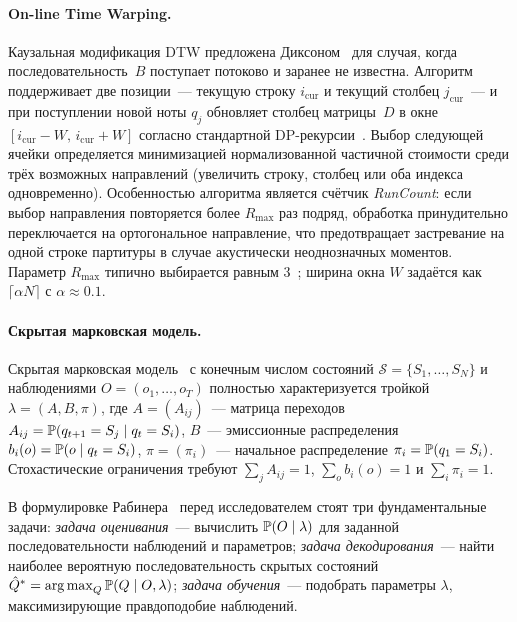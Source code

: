 \paragraph*{On-line Time Warping.} Каузальная модификация DTW
предложена Диксоном~\cite{Dixon2005} для случая, когда
последовательность~$B$ поступает потоково и заранее не известна.
Алгоритм поддерживает две позиции~--- текущую строку
$i_{\text{cur}}$ и текущий столбец $j_{\text{cur}}$~--- и при
поступлении новой ноты $q_j$ обновляет столбец матрицы~$D$ в окне
$[i_{\text{cur}}-W,\,i_{\text{cur}}+W]$ согласно стандартной
DP-рекурсии~. Выбор следующей ячейки
определяется минимизацией нормализованной частичной стоимости
среди трёх возможных направлений (увеличить строку, столбец или
оба индекса одновременно). Особенностью алгоритма является
счётчик \textit{RunCount}: если выбор направления повторяется
более $R_{\max}$ раз подряд, обработка принудительно
переключается на ортогональное направление, что предотвращает
застревание на одной строке партитуры в случае акустически
неоднозначных моментов. Параметр $R_{\max}$ типично выбирается
равным $3$~\cite{Dixon2005}; ширина окна $W$ задаётся как
$\lceil \alpha N\rceil$ с $\alpha\approx 0.1$.

\paragraph*{Скрытая марковская модель.} Скрытая марковская
модель~\cite{Rabiner1989} с конечным числом состояний
$\mathcal{S}=\{S_1,\dots,S_N\}$ и наблюдениями
$O=(o_1,\dots,o_T)$ полностью характеризуется тройкой
$\lambda=(A,B,\pi)$, где $A=(A_{ij})$~--- матрица переходов
$A_{ij}=\mathbb{P}(q_{t+1}=S_j\mid q_t=S_i)$, $B$~--- эмиссионные
распределения $b_i(o)=\mathbb{P}(o\mid q_t=S_i)$, $\pi=(\pi_i)$~---
начальное распределение $\pi_i=\mathbb{P}(q_1=S_i)$. Стохастические
ограничения требуют $\sum_j A_{ij}=1$, $\sum_o b_i(o)=1$ и
$\sum_i\pi_i=1$.

В формулировке Рабинера~\cite[стр.~261]{Rabiner1989} перед
исследователем стоят три фундаментальные задачи: \textit{задача
оценивания}~--- вычислить $\mathbb{P}(O\mid\lambda)$ для заданной
последовательности наблюдений и параметров; \textit{задача
декодирования}~--- найти наиболее вероятную последовательность
скрытых состояний $\hat Q^* = \operatorname*{arg\,max}_Q \mathbb{P}(Q\mid O,\lambda)$;
\textit{задача обучения}~--- подобрать параметры $\lambda$,
максимизирующие правдоподобие наблюдений.

